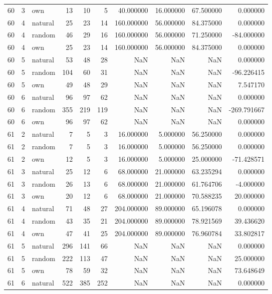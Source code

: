 \begin{table}[htbp]
\begin{tabular}{rrlrrrrrrr}
60 & 3 & own & 13 & 10 & 5 & 40.000000 & 16.000000 & 67.500000 & 0.000000 \\
60 & 4 & natural & 25 & 23 & 14 & 160.000000 & 56.000000 & 84.375000 & 0.000000 \\
60 & 4 & random & 46 & 29 & 16 & 160.000000 & 56.000000 & 71.250000 & -84.000000 \\
60 & 4 & own & 25 & 23 & 14 & 160.000000 & 56.000000 & 84.375000 & 0.000000 \\
60 & 5 & natural & 53 & 48 & 28 & NaN & NaN & NaN & 0.000000 \\
60 & 5 & random & 104 & 60 & 31 & NaN & NaN & NaN & -96.226415 \\
60 & 5 & own & 49 & 48 & 29 & NaN & NaN & NaN & 7.547170 \\
60 & 6 & natural & 96 & 97 & 62 & NaN & NaN & NaN & 0.000000 \\
60 & 6 & random & 355 & 219 & 119 & NaN & NaN & NaN & -269.791667 \\
60 & 6 & own & 96 & 97 & 62 & NaN & NaN & NaN & 0.000000 \\
61 & 2 & natural & 7 & 5 & 3 & 16.000000 & 5.000000 & 56.250000 & 0.000000 \\
61 & 2 & random & 7 & 5 & 3 & 16.000000 & 5.000000 & 56.250000 & 0.000000 \\
61 & 2 & own & 12 & 5 & 3 & 16.000000 & 5.000000 & 25.000000 & -71.428571 \\
61 & 3 & natural & 25 & 12 & 6 & 68.000000 & 21.000000 & 63.235294 & 0.000000 \\
61 & 3 & random & 26 & 13 & 6 & 68.000000 & 21.000000 & 61.764706 & -4.000000 \\
61 & 3 & own & 20 & 12 & 6 & 68.000000 & 21.000000 & 70.588235 & 20.000000 \\
61 & 4 & natural & 71 & 48 & 27 & 204.000000 & 89.000000 & 65.196078 & 0.000000 \\
61 & 4 & random & 43 & 35 & 21 & 204.000000 & 89.000000 & 78.921569 & 39.436620 \\
61 & 4 & own & 47 & 41 & 25 & 204.000000 & 89.000000 & 76.960784 & 33.802817 \\
61 & 5 & natural & 296 & 141 & 66 & NaN & NaN & NaN & 0.000000 \\
61 & 5 & random & 222 & 113 & 47 & NaN & NaN & NaN & 25.000000 \\
61 & 5 & own & 78 & 59 & 32 & NaN & NaN & NaN & 73.648649 \\
61 & 6 & natural & 522 & 385 & 252 & NaN & NaN & NaN & 0.000000 \\

\end{tabular}
\end{table}
